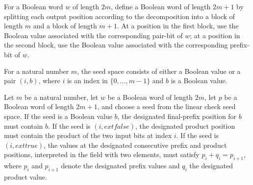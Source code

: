 \begin{definition}
\label{FABL.innerProductLinearProof}
\leanok
{}
For a Boolean word $w$ of length $2m$, define a Boolean word of length $2m+1$ by
splitting each output position according to the decomposition into a block of length $m$
and a block of length $m+1$. At a position in the first block, use the Boolean value
associated with the corresponding pair-bit of $w$; at a position in the second block,
use the Boolean value associated with the corresponding prefix-bit of $w$.
\end{definition}

\begin{definition}
\label{FABL.InnerProductLinearCheckSeed}
\leanok
For a natural number $m$, the seed space consists of either a Boolean value or a pair
$(i,b)$, where $i$ is an index in $\{0,\ldots,m-1\}$ and $b$ is a Boolean value.
\end{definition}

\begin{definition}
\label{FABL.InnerProductLinearCheckHolds}
\leanok
{}
Let $m$ be a natural number, let $w$ be a Boolean word of length $2m$, let $p$ be a
Boolean word of length $2m+1$, and choose a seed from the linear check seed space. If
the seed is a Boolean value $b$, the designated final-prefix position for $b$ must
contain $b$. If the seed is $(i,	ext{false})$, the designated product position must
contain the product of the two input bits at index $i$. If the seed is $(i,	ext{true})$,
the values at the designated consecutive prefix and product positions, interpreted in
the field with two elements, must satisfy $p_i+q_i=p_{i+1}$, where $p_i$ and $p_{i+1}$
denote the designated prefix values and $q_i$ the designated product value.
\end{definition}

